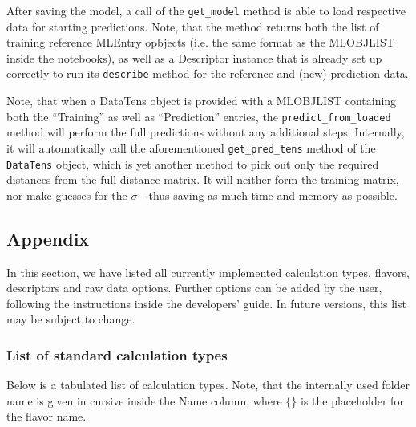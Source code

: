 \documentclass[12pt]{achemso}
\begin{document}
\noindent After saving the model, a call of the \texttt{get\_model} method is able to load respective data for starting predictions. Note, that the method returns both the list of training reference MLEntry opbjects (i.e. the same format as the MLOBJLIST inside the notebooks), as well as a Descriptor instance that is already set up correctly to run its \verb+describe+ method for the reference and (new) prediction data.

\noindent Note, that when a DataTens object is provided with a MLOBJLIST containing both the ``Training'' as well as ``Prediction'' entries, the \texttt{predict\_from\_loaded} method will perform the full predictions without any additional steps. Internally, it will automatically call the aforementioned \texttt{get\_pred\_tens} method of the \texttt{DataTens} object, which is yet another method to pick out only the required distances from the full distance matrix. It will neither form the training matrix, nor make guesses for the $\sigma$ - thus saving as much time and memory as possible.

\newpage
\subsection{Appendix}

In this section, we have listed all currently implemented calculation types, flavors, descriptors and raw data options. Further options can be added by the user, following the instructions inside the developers' guide. In future versions, this list may be subject to change.

\subsubsection{List of standard calculation types}

Below is a tabulated list of calculation types. Note, that the internally used folder name is given in cursive inside the Name column, where $\{\}$ is the placeholder for the flavor name.
\end{document}
